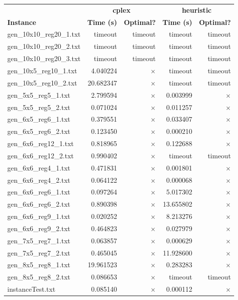 \documentclass{article}
\begin{document}
\begin{center}
\renewcommand{\arraystretch}{1.4}
 \begin{tabular}{lrrrr}
	\hline
 & \multicolumn{2}{c}{\textbf{cplex}} & \multicolumn{2}{c}{\textbf{heuristic}}\\
\textbf{Instance}  & \textbf{Time (s)} & \textbf{Optimal?}  & \textbf{Time (s)} & \textbf{Optimal?} \\\hline

gen\_10x10\_reg20\_1.txt & timeout & timeout & timeout & timeout\\
gen\_10x10\_reg20\_2.txt & timeout & timeout & timeout & timeout\\
gen\_10x10\_reg20\_3.txt & timeout & timeout & timeout & timeout\\
gen\_10x5\_reg10\_1.txt & 4.040224 & $\times$ & timeout & timeout\\
gen\_10x5\_reg10\_2.txt & 20.682347 & $\times$ & timeout & timeout\\
gen\_5x5\_reg5\_1.txt & 2.799594 & $\times$ & 0.003999 & $\times$\\
gen\_5x5\_reg5\_2.txt & 0.071024 & $\times$ & 0.011257 & $\times$\\
gen\_6x5\_reg6\_1.txt & 0.379551 & $\times$ & 0.033407 & $\times$\\
gen\_6x5\_reg6\_2.txt & 0.123450 & $\times$ & 0.000210 & $\times$\\
gen\_6x6\_reg12\_1.txt & 0.818965 & $\times$ & 0.122688 & $\times$\\
gen\_6x6\_reg12\_2.txt & 0.990402 & $\times$ & timeout & timeout\\
gen\_6x6\_reg4\_1.txt & 0.471831 & $\times$ & 0.001801 & $\times$\\
gen\_6x6\_reg4\_2.txt & 0.064122 & $\times$ & 0.000068 & $\times$\\
gen\_6x6\_reg6\_1.txt & 0.097264 & $\times$ & 5.017302 & $\times$\\
gen\_6x6\_reg6\_2.txt & 0.890398 & $\times$ & 13.655802 & $\times$\\
gen\_6x6\_reg9\_1.txt & 0.020252 & $\times$ & 8.213276 & $\times$\\
gen\_6x6\_reg9\_2.txt & 0.464823 & $\times$ & 0.027979 & $\times$\\
gen\_7x5\_reg7\_1.txt & 0.063857 & $\times$ & 0.000629 & $\times$\\
gen\_7x5\_reg7\_2.txt & 0.465045 & $\times$ & 11.928600 & $\times$\\
gen\_8x5\_reg8\_1.txt & 19.961523 & $\times$ & 0.283283 & $\times$\\
gen\_8x5\_reg8\_2.txt & 0.086653 & $\times$ & timeout & timeout\\
instanceTest.txt & 0.085140 & $\times$ & 0.000112 & $\times$\\
\hline\end{tabular}
\end{center}
\end{document}
